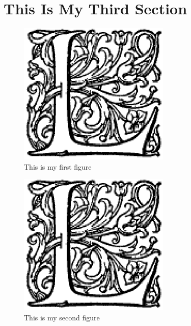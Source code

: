 \section{This Is My Third Section}
\noindent

\begin{figure}[h]
  \begin{center}
    \includegraphics{imagen}
    \caption{This is my first figure}
  \end{center}
\end{figure}




\begin{figure}[h]
  \begin{center}
    \includegraphics{imagen}
    \caption{This is my second figure}
  \end{center}
\end{figure}











\endinput 